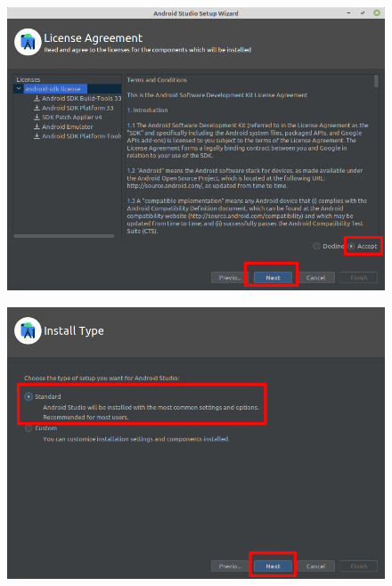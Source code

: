 \documentclass{article}
\begin{document}
\begin{enumerate}
\begin{minipage}{0.5\textwidth}
\begin{figure}[H]
        \end{figure}
        \begin{figure}[H]
            \includegraphics[scale=0.27]{5.png}
        \end{figure}
        \end{minipage}
        \begin{minipage}{0.5\textwidth}
        \begin{figure}[H]
            \includegraphics[scale=0.28]{2.png}
        \end{figure}
        \begin{figure}[H]

\end{figure}
\end{minipage}
\end{enumerate}
\end{document}
